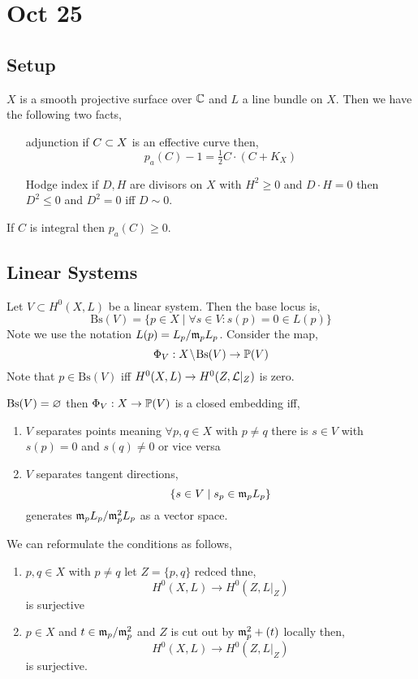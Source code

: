 \documentclass[12pt]{article}
\begin{document}
\section{Oct 25}

\subsection{Setup}

$X$ is a smooth projective surface over $\CC$ and $L$ a line bundle on $X$. Then we have the following two facts,
\begin{enumerate}
\item[adjunction] if $C \sub X$ is an effective curve then,
\[ p_a(C) - 1 = \tfrac{1}{2} C \cdot (C + K_X) \]
\item[Hodge index]
if $D, H$ are divisors on $X$ with $H^2 \ge 0$ and $D \cdot H = 0$ then $D^2 \le 0$ and $D^2 = 0$ iff $D \sim 0$.
\end{enumerate}

\begin{rmk}
If $C$ is integral then $p_a(C) \ge 0$.
\end{rmk}

\subsection{Linear Systems}

\newcommand{\Bs}{\mathrm{Bs}}

Let $V \subset H^0(X, L)$ be a linear system. Then the base locus is,
\[ \Bs(V) = \{ p \in X \mid \forall s \in V : s(p) = 0 \in L(p) \} \]
Note we use the notation $L(p) = L_p / \m_p L_p$. Consider the map,
\[ \Phi_V : X \sm \Bs(V) \to \P(V) \]
Note that $p \in \Bs(V)$ iff $H^0(X, L) \to H^0(Z, \L|_{Z})$ is zero. 

\begin{prop}
$\Bs(V) = \empty$ then $\Phi_V : X \to \P(V)$ is a closed embedding iff,
\begin{enumerate}
\item $V$ separates points meaning $\forall p,q \in X$ with $p \neq q$ there is $s \in V$ with $s(p) = 0$ and $s(q) \neq 0$ or vice versa
\item $V$ separates tangent directions,
\[ \{ s \in V \mid s_p \in \m_p L_p \} \]
generates $\m_p L_p / \m_p^2 L_p$ as a vector space.
\end{enumerate}
\end{prop}

\begin{rmk}
We can reformulate the conditions as follows,
\begin{enumerate}
\item $p,q \in X$ with $p \neq q$ let $Z = \{ p,q \}$ redced thne,
\[ H^0(X, L) \to H^0(Z, L|_Z) \]
is surjective
\item $p \in X$ and $t \in \m_p / \m_p^2$ and $Z$ is cut out by $\m_p^2 + (t)$ locally then,
\[ H^0(X, L) \to H^0(Z, L|_Z) \]
is surjective. 
\end{enumerate}
\end{rmk}
\end{document}
